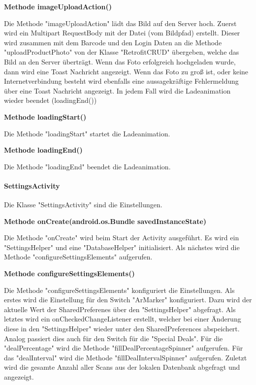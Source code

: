 \documentclass{scrartcl}
\begin{document}
\noindent\textbf{Methode imageUploadAction()}

\noindent Die Methode "imageUploadAction" lädt das Bild auf den Server hoch. Zuerst wird ein Multipart RequestBody mit der Datei (vom Bildpfad) erstellt. Dieser wird zusammen mit dem Barcode und den Login Daten an die Methode "uploadProductPhoto" von der Klasse "RetrofitCRUD" übergeben, welche das Bild an den Server überträgt. Wenn das Foto erfolgreich hochgeladen wurde, dann wird eine Toast Nachricht angezeigt. Wenn das Foto zu groß ist, oder keine Internetverbindung besteht wird ebenfalls eine aussagekräftige Fehlermeldung über eine Toast Nachricht angezeigt. In jedem Fall wird die Ladeanimation wieder beendet (loadingEnd()) \newline 

\noindent\textbf{Methode loadingStart()}

\noindent Die Methode "loadingStart" startet die Ladeanimation. \newline

\noindent\textbf{Methode loadingEnd()}

\noindent Die Methode "loadingEnd" beendet die Ladeanimation. \newline

\paragraph{SettingsActivity}
Die Klasse "SettingsActivity" sind die Einstellungen. \newline 

\noindent\textbf{Methode onCreate(android.os.Bundle savedInstanceState)}

\noindent Die Methode "onCreate" wird beim Start der Activity ausgeführt. Es wird ein "SettingsHelper" und eine "DatabaseHelper" initialisiert. Als nächstes wird die Methode "configureSettingsElements" aufgerufen. \newline 

\noindent\textbf{Methode configureSettingsElements()}

\noindent Die Methode "configureSettingsElements" konfiguriert die Einstellungen. Als erstes wird die Einstellung für den Switch "ArMarker" konfiguriert. Dazu wird der aktuelle Wert der SharedPreferenes über den "SettingsHelper" abgefragt. Als letztes wird ein onCheckedChangeListener erstellt, welcher bei einer Änderung diese in den "SettingsHelper" wieder unter den SharedPreferences abspeichert. Analog passiert dies auch für den Switch für die "Special Deals". Für die "dealPercentage" wird die Methode "fillDealPercentageSpinner" aufgerufen. Für das "dealInterval" wird die Methode "fillDealIntervalSpinner" aufgerufen. Zuletzt wird die gesamte Anzahl aller Scans aus der lokalen Datenbank abgefragt und angezeigt. \newline 
\end{document}
